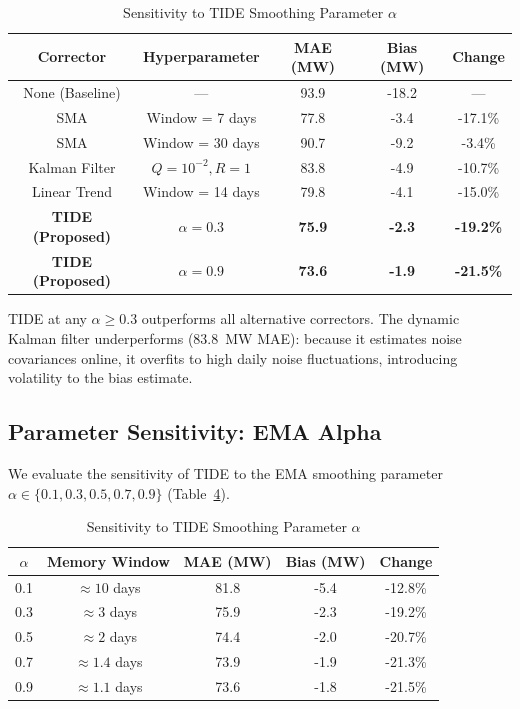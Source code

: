 \documentclass[journal]{IEEEtran}
\begin{document}
\begin{table}[t]
\begin{table}[htbp]
\caption{Comparison of Online Bias Correctors}
\label{tab:correctors}
\centering
\begin{tabular}{ccccc}
\toprule
\textbf{Corrector} & \textbf{Hyperparameter} & \textbf{MAE (MW)} & \textbf{Bias (MW)} & \textbf{Change} \\
\midrule
None (Baseline) & --- & 93.9 & -18.2 & --- \\
SMA & Window = 7 days & 77.8 & -3.4 & -17.1\% \\
SMA & Window = 30 days & 90.7 & -9.2 & -3.4\% \\
Kalman Filter & $Q=10^{-2}, R=1$ & 83.8 & -4.9 & -10.7\% \\
Linear Trend & Window = 14 days & 79.8 & -4.1 & -15.0\% \\
\textbf{TIDE (Proposed)} & \textbf{$\alpha = 0.3$} & \textbf{75.9} & \textbf{-2.3} & \textbf{-19.2\%} \\
\textbf{TIDE (Proposed)} & \textbf{$\alpha = 0.9$} & \textbf{73.6} & \textbf{-1.9} & \textbf{-21.5\%} \\
\bottomrule
\end{tabular}
\end{table}

TIDE at any $\alpha \geq 0.3$ outperforms all alternative correctors. The dynamic Kalman filter underperforms (83.8~MW MAE): because it estimates noise covariances online, it overfits to high daily noise fluctuations, introducing volatility to the bias estimate.

\subsection{Parameter Sensitivity: EMA Alpha}
We evaluate the sensitivity of TIDE to the EMA smoothing parameter $\alpha \in \{0.1, 0.3, 0.5, 0.7, 0.9\}$ (Table~\ref{tab:alpha_sens}).

\begin{table}[htbp]
\caption{Sensitivity to TIDE Smoothing Parameter $\alpha$}
\label{tab:alpha_sens}
\centering
\begin{tabular}{ccccc}
\toprule
\textbf{$\alpha$} & \textbf{Memory Window} & \textbf{MAE (MW)} & \textbf{Bias (MW)} & \textbf{Change} \\
\midrule
0.1 & $\approx 10$ days & 81.8 & -5.4 & -12.8\% \\
0.3 & $\approx 3$ days & 75.9 & -2.3 & -19.2\% \\
0.5 & $\approx 2$ days & 74.4 & -2.0 & -20.7\% \\
0.7 & $\approx 1.4$ days & 73.9 & -1.9 & -21.3\% \\
0.9 & $\approx 1.1$ days & 73.6 & -1.8 & -21.5\% \\
\bottomrule
\end{tabular}
\end{table}


\end{table}
\end{document}
